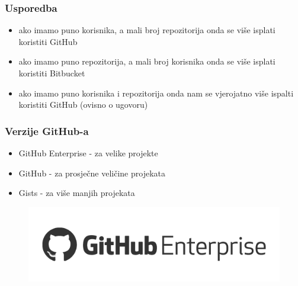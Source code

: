 \documentclass[12p, Times New Roman]{beamer}
\begin{document}
	\begin{frame}				%
		\frametitle{Usporedba}

		\begin{itemize}
			\item ako imamo puno korisnika, a mali broj repozitorija onda se više isplati koristiti GitHub
			\item ako imamo puno repozitorija, a mali broj korisnika onda se više isplati koristiti Bitbucket
			\item ako imamo puno korisnika i repozitorija onda nam se vjerojatno više ispalti koristiti GitHub (ovisno o ugovoru)

		\end{itemize}


	\end{frame}

	\begin{frame}				%
		\frametitle{Verzije GitHub-a}
		\begin{itemize}
			\item GitHub Enterprise - za velike projekte
			\item GitHub - za prosječne veličine projekata
			\item Gists - za više manjih projekata

		\end{itemize}

		\begin{figure}
			\begin{center}
				\includegraphics[scale=0.9]{enterprise.png}
			\end{center}
		\end{figure}

	\end{frame}
\end{document}
